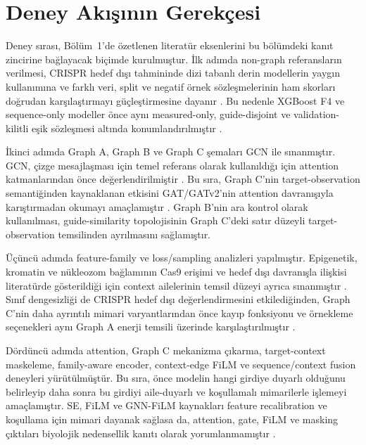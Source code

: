 \section{Deney Akışının Gerekçesi}

Deney sırası, Bölüm~1'de özetlenen literatür eksenlerini bu bölümdeki kanıt zincirine bağlayacak biçimde kurulmuştur. İlk adımda non-graph referansların verilmesi, CRISPR hedef dışı tahmininde dizi tabanlı derin modellerin yaygın kullanımına ve farklı veri, split ve negatif örnek sözleşmelerinin ham skorları doğrudan karşılaştırmayı güçleştirmesine dayanır . Bu nedenle XGBoost F4 ve sequence-only modeller önce aynı measured-only, guide-disjoint ve validation-kilitli eşik sözleşmesi altında konumlandırılmıştır .

İkinci adımda Graph A, Graph B ve Graph C şemaları GCN ile sınanmıştır. GCN, çizge mesajlaşması için temel referans olarak kullanıldığı için attention katmanlarından önce değerlendirilmiştir . Bu sıra, Graph C'nin target-observation semantiğinden kaynaklanan etkisini GAT/GATv2'nin attention davranışıyla karıştırmadan okumayı amaçlamıştır . Graph B'nin ara kontrol olarak kullanılması, guide-similarity topolojisinin Graph C'deki satır düzeyli target-observation temsilinden ayrılmasını sağlamıştır.

Üçüncü adımda feature-family ve loss/sampling analizleri yapılmıştır. Epigenetik, kromatin ve nükleozom bağlamının Cas9 erişimi ve hedef dışı davranışla ilişkisi literatürde gösterildiği için context ailelerinin temsil düzeyi ayrıca sınanmıştır . Sınıf dengesizliği de CRISPR hedef dışı değerlendirmesini etkilediğinden, Graph C'nin daha ayrıntılı mimari varyantlarından önce kayıp fonksiyonu ve örnekleme seçenekleri aynı Graph A enerji temsili üzerinde karşılaştırılmıştır .

Dördüncü adımda attention, Graph C mekanizma çıkarma, target-context maskeleme, family-aware encoder, context-edge FiLM ve sequence/context fusion deneyleri yürütülmüştür. Bu sıra, önce modelin hangi girdiye duyarlı olduğunu belirleyip daha sonra bu girdiyi aile-duyarlı ve koşullamalı mimarilerle işlemeyi amaçlamıştır. SE, FiLM ve GNN-FiLM kaynakları feature recalibration ve koşullama için mimari dayanak sağlasa da, attention, gate, FiLM ve masking çıktıları biyolojik nedensellik kanıtı olarak yorumlanmamıştır .

